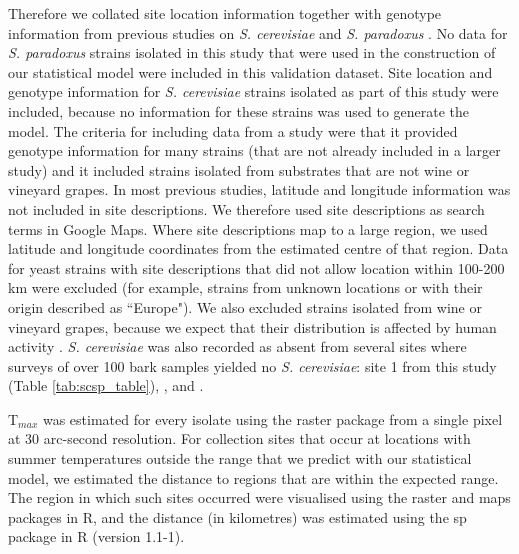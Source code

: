 \documentclass[12pt]{article}
\begin{document}
\begin{linenumbers}
Therefore we collated site location information together with genotype information from previous studies on \textit{S. cerevisiae} \citep{zhang_saccharomyces_2010,wang_surprisingly_2012,cromie_genomic_2013,almeida_population_2015} and \textit{S. paradoxus} \citep{naumov_differentiation_1997,kuehne_allopatric_2007,liti_population_2009,zhang_saccharomyces_2010,leducq_local_2014}. No data for \textit{S. paradoxus} strains isolated in this study that were used in the construction of our statistical model were included in this validation dataset. Site location and genotype information for \textit{S. cerevisiae} strains isolated as part of this study were included, because no information for these strains was used to generate the model. The criteria for including data from a study were that it provided genotype information for many strains (that are not already included in a larger study) and it included strains isolated from substrates that are not wine or vineyard grapes. In most previous studies, latitude and longitude information was not included in site descriptions. We therefore used site descriptions as search terms in Google Maps. Where site descriptions map to a large region, we used latitude and longitude coordinates from the estimated centre of that region. Data for yeast strains with site descriptions that did not allow location within 100-200 km were excluded (for example, strains from unknown locations or with their origin described as ``Europe"). We also excluded strains isolated from wine or vineyard grapes, because we expect that their distribution is affected by human activity \citep{fay_evidence_2005}. \textit{S. cerevisiae} was also recorded as absent from several sites where surveys of over 100 bark samples yielded no \textit{S. cerevisiae}: site 1 from this study (Table \ref{tab:scsp_table}), \citet{charron_exploring_2014}, \citet{johnson_population_2004} and \citet{kowallik_interaction_2015}. 

T$_{max}$ was estimated for every isolate using the raster package from a single pixel at 30 arc-second resolution. For collection sites that occur at locations with summer temperatures outside the range that we predict with our statistical model, we estimated the distance to regions that are within the expected range. The region in which such sites occurred were visualised using the raster and maps packages in R, and the distance (in kilometres) was estimated using the sp package in R (version 1.1-1).

\clearpage



\end{linenumbers}
\end{document}

